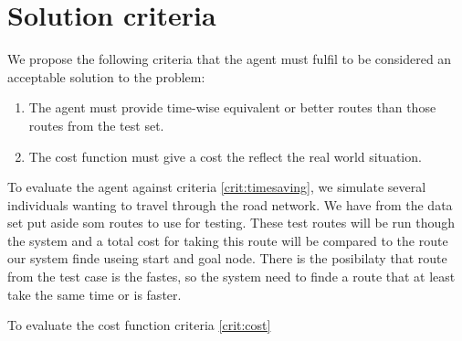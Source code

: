 \section{Solution criteria}
We propose the following criteria that the agent must fulfil to be considered an acceptable solution to the problem:

\begin{enumerate}
\item The agent must provide time-wise equivalent or better routes than those routes from the test set.\label{crit:timesaving}
\item The cost function must give a cost the reflect the real world situation.\label{crit:cost}
\end{enumerate}

To evaluate the agent against criteria \ref{crit:timesaving}, we simulate several individuals wanting to travel through the road network. We have from the data set put aside som routes to use for testing. These test routes will be run though the system and a total cost for taking this route will be compared to the route our system finde useing start and goal node. There is the posibilaty that route from the test case is the fastes, so the system need to finde a route that at least take the same time or is faster.

To evaluate the cost function criteria \ref{crit:cost}


